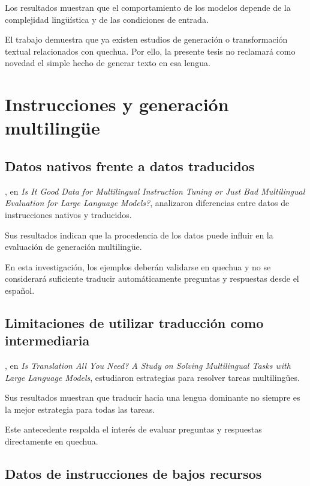Los resultados muestran que el comportamiento de los modelos depende de la complejidad lingüística y de las condiciones de entrada.

El trabajo demuestra que ya existen estudios de generación o transformación textual relacionados con quechua. Por ello, la presente tesis no reclamará como novedad el simple hecho de generar texto en esa lengua.

\section{Instrucciones y generación multilingüe}\label{instrucciones-y-generaciuxf3n-multilinguxfce}

\subsection{Datos nativos frente a datos traducidos}\label{datos-nativos-frente-a-datos-traducidos}

\textcite{Chen2024}, en \emph{Is It Good Data for Multilingual Instruction Tuning or Just Bad Multilingual Evaluation for Large Language Models?}, analizaron diferencias entre datos de instrucciones nativos y traducidos.

Sus resultados indican que la procedencia de los datos puede influir en la evaluación de generación multilingüe.

En esta investigación, los ejemplos deberán validarse en quechua y no se considerará suficiente traducir automáticamente preguntas y respuestas desde el español.

\subsection{Limitaciones de utilizar traducción como intermediaria}\label{limitaciones-de-utilizar-traducciuxf3n-como-intermediaria}

\textcite{Liu2025}, en \emph{Is Translation All You Need? A Study on Solving Multilingual Tasks with Large Language Models}, estudiaron estrategias para resolver tareas multilingües.

Sus resultados muestran que traducir hacia una lengua dominante no siempre es la mejor estrategia para todas las tareas.

Este antecedente respalda el interés de evaluar preguntas y respuestas directamente en quechua.

\subsection{Datos de instrucciones de bajos recursos}\label{datos-de-instrucciones-de-bajos-recursos}

